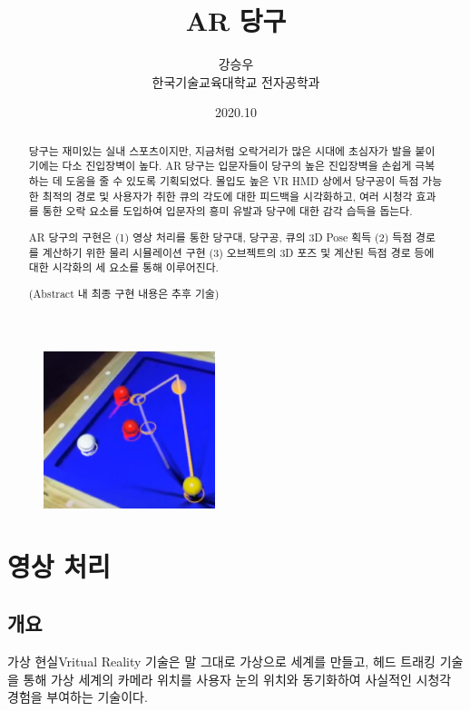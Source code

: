 \documentclass[10pt]{oblivoir}
\title{AR 당구}
\author{강승우 \\ 한국기술교육대학교 전자공학과}
\date{2020.10}
\newcommand{\textss}[1]{\scriptsize#1\normalsize}
\begin{document}
\maketitle

\begin{figure}[ht]
    \centering
    \includegraphics[width=5cm]{img/abstract-final.png}
\end{figure}

\begin{abstract}
    당구는 재미있는 실내 스포츠이지만, 지금처럼 오락거리가 많은 시대에 초심자가 발을 붙이기에는 다소 진입장벽이 높다. AR 당구는 입문자들이 당구의 높은 진입장벽을 손쉽게 극복하는 데 도움을 줄 수 있도록 기획되었다. 몰입도 높은 VR HMD \footnotemark 상에서 당구공이 득점 가능한 최적의 경로 및 사용자가 취한 큐의 각도에 대한 피드백을 시각화하고, 여러 시청각 효과를 통한 오락 요소를 도입하여 입문자의 흥미 유발과 당구에 대한 감각 습득을 돕는다.

    AR 당구의 구현은 (1) 영상 처리를 통한 당구대, 당구공, 큐의 3D Pose 획득 (2) 득점 경로를 계산하기 위한 물리 시뮬레이션 구현 (3) 오브젝트의 3D 포즈 및 계산된 득점 경로 등에 대한 시각화의 세 요소를 통해 이루어진다.

    (Abstract 내 최종 구현 내용은 추후 기술)
\end{abstract}

\newpage

\twocolumn[]
\section{영상 처리}
\subsection{개요}
가상 현실\textss{Vritual Reality} 기술은 말 그대로 가상으로 세계를 만들고, 헤드 트래킹 기술을 통해 가상 세계의 카메라 위치를 사용자 눈의 위치와 동기화하여 사실적인 시청각 경험을 부여하는 기술이다.
\end{document}
